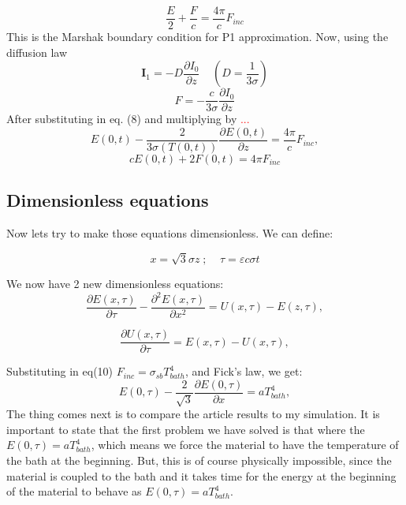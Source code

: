 \documentclass{article}
\begin{document}
\begin{equation}
 \frac{E}{2} +\frac{F}{c}= \frac{4\pi}{c}F_{inc}
\end{equation}
This is the Marshak boundary condition for P1 approximation. Now, using the diffusion law
\begin{equation}
    \bm{I}_1=-D\frac{\partial I_0}{\partial z}\;\;\;\;(D=\frac{1}{3\sigma})
\end{equation}
\begin{equation}
    F=-\frac{c}{3\sigma}\frac{\partial I_0}{\partial z}
\end{equation}
After substituting in eq. (8) and multiplying by \textcolor{red}{...}
\begin{equation}
E(0,t) -\frac{2}{3\sigma(T(0,t))} \frac{\partial E(0,t)}{\partial z} = \frac{4\pi}{c}F_{inc}, 
\end{equation}
\begin{equation}
cE(0,t) + 2F(0,t) = 4\pi F_{inc}
\end{equation}

\subsection*{Dimensionless equations}
Now lets try to make those equations dimensionless. We can define:

\begin{equation}
x = \sqrt3 \sigma z \;; \;\;\;\;\tau = \varepsilon c\sigma t
\end{equation}

We now have 2 new dimensionless equations:
\begin{equation}
\frac{\partial E(x,\tau)}{\partial \tau} - \frac{\partial^2E(x,\tau)}{\partial x^2} = U(x,\tau) - E(z,\tau),
\end{equation}

\begin{equation}
\frac{\partial U(x,\tau)}{\partial \tau} = E(x,\tau) - U(x,\tau),
\end{equation}

Substituting in eq(10) $F_{inc} = \sigma_{sb}T_{bath}^4$, and Fick's law, we get:
\begin{equation}
E(0,\tau)-  \frac{2}{\sqrt3} \frac{\partial E(0,\tau)}{\partial x} = aT_{bath}^4,
\end{equation}
The thing comes next is to compare the article results to my simulation. It is important to state that the first problem we have solved is that where the $E(0,\tau) = aT_{bath}^4$, which means we force the material to have the temperature of the bath at the beginning. But, this is of course physically impossible, since the material is coupled to the bath and it takes time for the energy at the beginning of the material to behave as $E(0,\tau) = aT_{bath}^4$.
\end{document}
